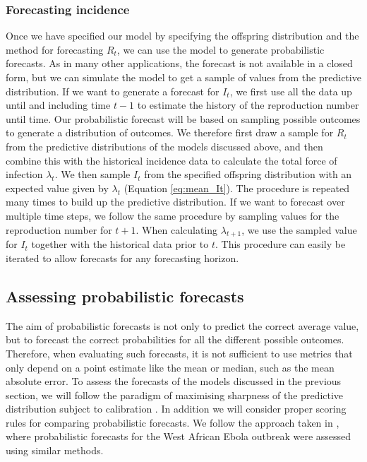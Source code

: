 \documentclass[12pt]{article}
\begin{document}
\subsubsection{Forecasting incidence}

Once we have specified our model by specifying the offspring distribution and the method for forecasting $R_t$, we can use the model to generate probabilistic forecasts. As in many other applications, the forecast is not available in a closed form, but we can simulate the model to get a sample of values from the predictive distribution. If we want to generate a forecast for $I_{t}$, we first use all the data up until and including time $t-1$ to estimate the history of the reproduction number until time. Our probabilistic forecast will be based on sampling possible outcomes to generate a distribution of outcomes. We therefore first draw a sample for $R_{t}$ from the predictive distributions of the models discussed above, and then combine this with the historical incidence data to calculate the total force of infection $\lambda_{t}$. We then sample $I_{t}$ from the specified offspring distribution with an expected value given by $\lambda_{t}$ (Equation \ref{eq:mean_It}). The procedure is repeated many times to build up the predictive distribution. If we want to forecast over multiple time steps, we follow the same procedure by sampling values for the reproduction number for $t+1$. When calculating $\lambda_{t+1}$, we use the sampled value for $I_{t}$ together with the historical data prior to $t$. This procedure can easily be iterated to allow forecasts for any forecasting horizon.


\subsection{Assessing probabilistic forecasts}

The aim of probabilistic forecasts is not only to predict the correct average value, but to forecast the correct probabilities for all the different possible outcomes. Therefore, when evaluating such forecasts, it is not sufficient to use metrics that only depend on a point estimate like the mean or median, such as the mean absolute error. To assess the forecasts of the models discussed in the previous section, we will follow the paradigm of maximising sharpness of the predictive distribution subject to calibration \cite{gneitingProbabilisticForecastsCalibration2007}. In addition we will consider proper scoring rules for comparing probabilistic forecasts. We follow the approach taken in \cite{funkAssessingPerformanceRealtime2019}, where probabilistic forecasts for the West African Ebola outbreak were assessed using similar methods.
\end{document}
